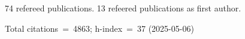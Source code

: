 74 refereed publications. 13 refeered publications as first author.

Total citations~=~4863; h-index~=~37 (2025-05-06)